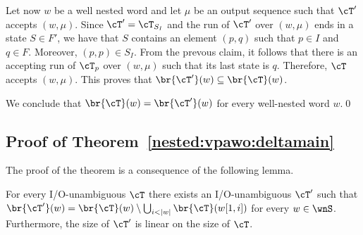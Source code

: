 Let now $w$ be a well nested word and let $\mu$ be an output sequence such that $\cT'$ accepts $(w, \mu)$. Since $\cT' = \cT_{S_I}$ and the run of $\cT'$ over $(w, \mu)$ ends in a state $S\in F'$, we have that $S$ contains an element $(p,q)$ such that $p\in I$ and $q\in F$. Moreover, $(p,p)\in S_I$. From the prevous claim, it follows that there is an accepting run of $\cT_p$ over $(w, \mu)$ such that its last state is $q$. Therefore, $\cT$ accepts $(w, \mu)$. This proves that $\br{\cT'}(w) \subseteq \br{\cT}(w)$.

We conclude that $\br{\cT}(w) = \br{\cT'}(w)$ for every well-nested word $w$.\qed



\subsection{Proof of Theorem~\ref{nested:vpawo:deltamain}}

The proof of the theorem is a consequence of the following lemma.

\begin{lemma}\label{nested:vpawo:delta}
	For every I/O-unambiguous \vpt $\cT$ there exists an I/O-unambiguous \vpt $\cT'$ such that $\br{\cT'}(w) = \br{\cT}(w) \setminus \bigcup_{i < |w|} \br{\cT}(	w[1, i])$ for every $w\in\wnS$. Furthermore, the size of $\cT'$ is linear on the size of $\cT$.
\end{lemma}

